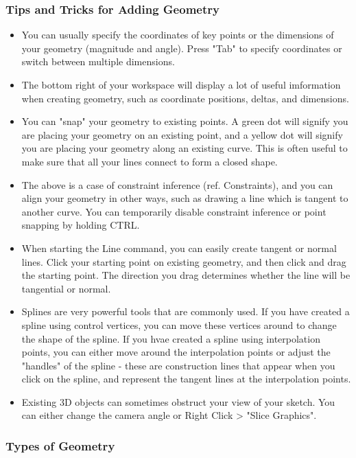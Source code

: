 \subsubsection{Tips and Tricks for Adding Geometry}
\begin{itemize}
    \item You can usually specify the coordinates of key points or the dimensions of your geometry (magnitude and angle). Press "Tab" to specify coordinates or switch between multiple dimensions.
    \item The bottom right of your workspace will display a lot of useful imformation when creating geometry, such as coordinate positions, deltas, and dimensions.
    \item You can "snap" your geometry to existing points. A green dot will signify you are placing your geometry on an existing point, and a yellow dot will signify you are placing your geometry along an existing curve. This is often useful to make sure that all your lines connect to form a closed shape.
    \item The above is a case of constraint inference (ref. Constraints), and you can align your geometry in other ways, such as drawing a line which is tangent to another curve. You can temporarily disable constraint inference or point snapping by holding CTRL.
    \item When starting the Line command, you can easily create tangent or normal lines. Click your starting point on existing geometry, and then click and drag the starting point. The direction you drag determines whether the line will be tangential or normal.
    \item Splines are very powerful tools that are commonly used. If you have created a spline using control vertices, you can move these vertices around to change the shape of the spline. If you hvae created a spline using interpolation points, you can either move around the interpolation points or adjust the "handles" of the spline - these are construction lines that appear when you click on the spline, and represent the tangent lines at the interpolation points.
    \item Existing 3D objects can sometimes obstruct your view of your sketch. You can either change the camera angle or Right Click > "Slice Graphics".
\end{itemize}

\subsubsection{Types of Geometry}

